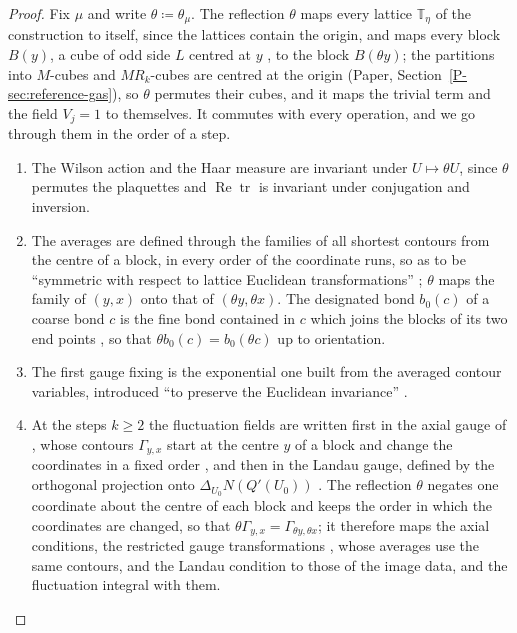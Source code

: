 \documentclass[11pt]{preprint}
\newcommand{\tr}{\operatorname{tr}}
\numberwithin{equation}{section}
\theoremstyle{definition}
\theoremstyle{remark}
\theoremstyle{plain}
\begin{document}
\begin{proof}
Fix $\mu$ and write $\theta \coloneqq \theta_\mu$. The reflection $\theta$ maps every lattice $\mathbb T_\eta$ of the construction to itself, since the lattices contain the origin, and maps every block $B(y)$, a cube of odd side $L$ centred at $y$ \cite[(0.3)]{BalabanRG1}, to the block $B(\theta y)$; the partitions into $M$-cubes and $MR_k$-cubes are centred at the origin (Paper, Section~\ref{P-sec:reference-gas}), so $\theta$ permutes their cubes, and it maps the trivial term and the field $V_j = 1$ to themselves. It commutes with every operation, and we go through them in the order of a step.
\begin{enumerate}[label=(\alph*)]
\item The Wilson action and the Haar measure are invariant under $U \mapsto \theta U$, since $\theta$ permutes the plaquettes and $\operatorname{Re}\tr$ is invariant under conjugation and inversion.
\item The averages are defined through the families of all shortest contours from the centre of a block, in every order of the coordinate runs, so as to be ``symmetric with respect to lattice Euclidean transformations'' \cite[p.~252, ll.~34--40]{BalabanRG1}; $\theta$ maps the family of $(y, x)$ onto that of $(\theta y, \theta x)$. The designated bond $b_0(c)$ of a coarse bond $c$ is the fine bond contained in $c$ which joins the blocks of its two end points \cite[p.~267, ll.~19--20]{BalabanRG1}, so that $\theta b_0(c) = b_0(\theta c)$ up to orientation.
\item The first gauge fixing is the exponential one built from the averaged contour variables, introduced ``to preserve the Euclidean invariance'' \cite[(1.5)--(1.7), p.~247]{BalabanCRE}.
\item At the steps $k \geq 2$ the fluctuation fields are written first in the axial gauge of \cite[(1.19), p.~79]{BalabanREG}, whose contours $\Gamma_{y,x}$ start at the centre $y$ of a block and change the coordinates in a fixed order \cite[(1.7), p.~18]{BalabanPRT1}, and then in the Landau gauge, defined by the orthogonal projection onto $\Delta_{U_0}N(Q'(U_0))$ \cite[(1.27), p.~80]{BalabanREG}. The reflection $\theta$ negates one coordinate about the centre of each block and keeps the order in which the coordinates are changed, so that $\theta\Gamma_{y,x} = \Gamma_{\theta y,\theta x}$; it therefore maps the axial conditions, the restricted gauge transformations \cite[(1.29), p.~81]{BalabanREG}, whose averages use the same contours, and the Landau condition to those of the image data, and the fluctuation integral \cite[(2.17)--(2.18), p.~269]{BalabanRG1} with them.

\end{enumerate}
\end{proof}
\end{document}
